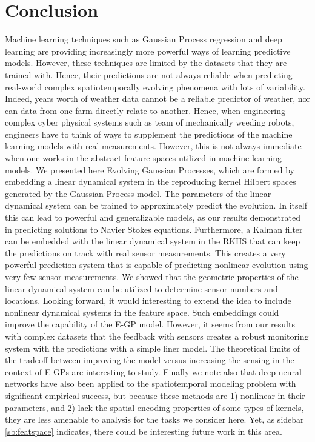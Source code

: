 \section{Conclusion}\label{sec:conclusion}
Machine learning techniques such as Gaussian Process regression and deep learning are providing increasingly more powerful ways of learning predictive models. However, these techniques are limited by the datasets that they are trained with. Hence, their predictions are not always reliable when predicting real-world complex spatiotemporally evolving phenomena with lots of variability. Indeed, years worth of weather data cannot be a reliable predictor of weather, nor can data from one farm directly relate to another. Hence, when engineering  complex cyber physical systems such as team of mechanically weeding robots, engineers have to think of ways to supplement the predictions of the machine learning models with real measurements. However, this is not always immediate when one works in the abstract feature spaces utilized in machine learning models. We presented here Evolving Gaussian Processes, which are formed by embedding a linear dynamical system in the %
reproducing kernel Hilbert spaces generated by the Gaussian Process model. The parameters of the linear dynamical system can be trained to approximately predict the evolution. In itself this can lead to powerful and generalizable models, as our results demonstrated in predicting solutions to Navier Stokes equations. Furthermore, a Kalman filter can be embedded with the linear dynamical system in the RKHS that can keep the predictions on track with real sensor measurements. This creates a very powerful prediction system that is capable of predicting nonlinear evolution using very few sensor measurements. We showed that the geometric properties of the linear dynamical system can be utilized to determine sensor numbers and locations. Looking forward, it would interesting to extend the idea to include nonlinear dynamical systems in the feature space. Such embeddings could improve the capability of the E-GP model. However, it seems from our results with complex datasets that the feedback with sensors creates a robust monitoring system with the predictions with a simple liner model. The theoretical limits of the tradeoff between improving the model versus increasing the sensing in the context of E-GPs are interesting to study. Finally we note also that deep neural networks have also been applied to the spatiotemporal modeling problem with significant empirical success\cite{tran2015learning}, but because these methods are 1) nonlinear in their parameters, and 2) lack the spatial-encoding properties of some types of kernels, they are less amenable to analysis for the tasks we consider here. Yet, as sidebar \ref{sb:featspace} indicates, there could be interesting future work in this area. %


